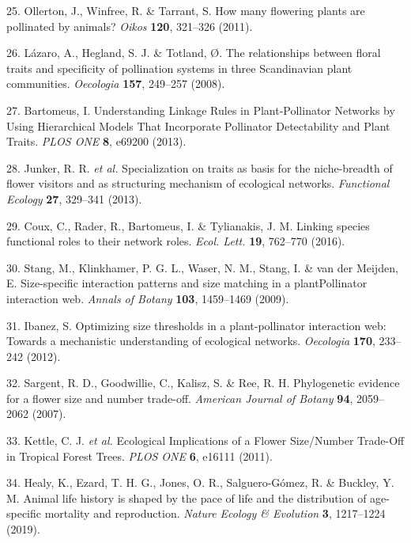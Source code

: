 \documentclass[12pt,a4paper,]{article}
\begin{document}
\hypertarget{ref-ollerton2011}{}
25. Ollerton, J., Winfree, R. \& Tarrant, S. How many flowering plants
are pollinated by animals? \emph{Oikos} \textbf{120}, 321--326 (2011).

\hypertarget{ref-lazaro2008}{}
26. Lázaro, A., Hegland, S. J. \& Totland, Ø. The relationships between
floral traits and specificity of pollination systems in three
Scandinavian plant communities. \emph{Oecologia} \textbf{157}, 249--257
(2008).

\hypertarget{ref-bartomeus2013}{}
27. Bartomeus, I. Understanding Linkage Rules in Plant-Pollinator
Networks by Using Hierarchical Models That Incorporate Pollinator
Detectability and Plant Traits. \emph{PLOS ONE} \textbf{8}, e69200
(2013).

\hypertarget{ref-junker2013}{}
28. Junker, R. R. \emph{et al.} Specialization on traits as basis for
the niche-breadth of flower visitors and as structuring mechanism of
ecological networks. \emph{Functional Ecology} \textbf{27}, 329--341
(2013).

\hypertarget{ref-coux2016}{}
29. Coux, C., Rader, R., Bartomeus, I. \& Tylianakis, J. M. Linking
species functional roles to their network roles. \emph{Ecol. Lett.}
\textbf{19}, 762--770 (2016).

\hypertarget{ref-stang2009}{}
30. Stang, M., Klinkhamer, P. G. L., Waser, N. M., Stang, I. \& van der
Meijden, E. Size-specific interaction patterns and size matching in a
plantPollinator interaction web. \emph{Annals of Botany} \textbf{103},
1459--1469 (2009).

\hypertarget{ref-ibanez2012}{}
31. Ibanez, S. Optimizing size thresholds in a plant-pollinator
interaction web: Towards a mechanistic understanding of ecological
networks. \emph{Oecologia} \textbf{170}, 233--242 (2012).

\hypertarget{ref-sargent2007}{}
32. Sargent, R. D., Goodwillie, C., Kalisz, S. \& Ree, R. H.
Phylogenetic evidence for a flower size and number trade-off.
\emph{American Journal of Botany} \textbf{94}, 2059--2062 (2007).

\hypertarget{ref-kettle2011}{}
33. Kettle, C. J. \emph{et al.} Ecological Implications of a Flower
Size/Number Trade-Off in Tropical Forest Trees. \emph{PLOS ONE}
\textbf{6}, e16111 (2011).

\hypertarget{ref-healy2019}{}
34. Healy, K., Ezard, T. H. G., Jones, O. R., Salguero-Gómez, R. \&
Buckley, Y. M. Animal life history is shaped by the pace of life and the
distribution of age-specific mortality and reproduction. \emph{Nature
Ecology \& Evolution} \textbf{3}, 1217--1224 (2019).
\end{document}
